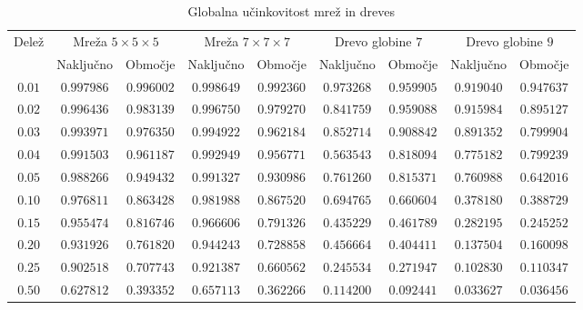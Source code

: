 \documentclass[a4paper, 16pt]{article}
\begin{document}
\begin{table}[!h]
    \begin{adjustwidth}{-.7in}{-.5in}  
    \begin{center}
    \begin{tabular}{c|c|c||c|c||c|c||c|c}
        \multirow{2}{*}{Delež} & 
        \multicolumn{2}{c}{Mreža $5 \times 5 \times 5$} & \multicolumn{2}{c}{Mreža $7 \times 7 \times 7$} & \multicolumn{2}{c}{Drevo globine $7$} & \multicolumn{2}{c}{Drevo globine $9$}\\
                & Naključno  & Območje    & Naključno  & Območje    & Naključno  & Območje    & Naključno  & Območje   \\ \hline
        $0.01$  & $0.997986$ & $0.996002$ & $0.998649$ & $0.992360$ & $0.973268$ & $0.959905$ & $0.919040$ & $0.947637$\\
        $0.02$  & $0.996436$ & $0.983139$ & $0.996750$ & $0.979270$ & $0.841759$ & $0.959088$ & $0.915984$ & $0.895127$\\
        $0.03$  & $0.993971$ & $0.976350$ & $0.994922$ & $0.962184$ & $0.852714$ & $0.908842$ & $0.891352$ & $0.799904$\\
        $0.04$  & $0.991503$ & $0.961187$ & $0.992949$ & $0.956771$ & $0.563543$ & $0.818094$ & $0.775182$ & $0.799239$\\
        $0.05$  & $0.988266$ & $0.949432$ & $0.991327$ & $0.930986$ & $0.761260$ & $0.815371$ & $0.760988$ & $0.642016$\\
        $0.10$  & $0.976811$ & $0.863428$ & $0.981988$ & $0.867520$ & $0.694765$ & $0.660604$ & $0.378180$ & $0.388729$\\
        $0.15$  & $0.955474$ & $0.816746$ & $0.966606$ & $0.791326$ & $0.435229$ & $0.461789$ & $0.282195$ & $0.245252$\\
        $0.20$  & $0.931926$ & $0.761820$ & $0.944243$ & $0.728858$ & $0.456664$ & $0.404411$ & $0.137504$ & $0.160098$\\
        $0.25$  & $0.902518$ & $0.707743$ & $0.921387$ & $0.660562$ & $0.245534$ & $0.271947$ & $0.102830$ & $0.110347$\\
        $0.50$  & $0.627812$ & $0.393352$ & $0.657113$ & $0.362266$ & $0.114200$ & $0.092441$ & $0.033627$ & $0.036456$

    \end{tabular}
    \caption{Globalna učinkovitost mrež in dreves}
    \label{table: 7}
    \end{center}
    \end{adjustwidth}
\end{table}
\end{document}
